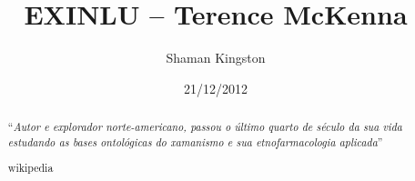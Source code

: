 %
%
%
%
%

% 
%
%
%
%
%
%
%
%
%
%
%

%
%

%
%
\pagestyle{empty}
%
\title{EXINLU -- Terence McKenna}
\author{Shaman Kingston}
\date{21/12/2012}
\maketitle
\renewcommand{\abstractname}{}
%
\begin{abstract}
\noindent``\emph{Autor e explorador norte-americano, passou o último 
quarto de século da sua vida estudando as bases ontológicas do 
xamanismo e sua etnofarmacologia aplicada}''
\begin{flushright}wikipedia\end{flushright}
\end{abstract}
\newpage
%
%
